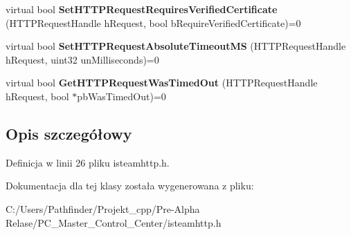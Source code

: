 \begin{DoxyCompactItemize}
\item 
\mbox{\label{class_i_steam_h_t_t_p_adfba72d99eeaabb5ee231c6bf915837d}} 
virtual bool {\bfseries Set\+H\+T\+T\+P\+Request\+Requires\+Verified\+Certificate} (H\+T\+T\+P\+Request\+Handle h\+Request, bool b\+Require\+Verified\+Certificate)=0
\item 
\mbox{\label{class_i_steam_h_t_t_p_a40ca210e9fd8a1d4a57a0856648a5ca3}} 
virtual bool {\bfseries Set\+H\+T\+T\+P\+Request\+Absolute\+Timeout\+MS} (H\+T\+T\+P\+Request\+Handle h\+Request, uint32 un\+Milliseconds)=0
\item 
\mbox{\label{class_i_steam_h_t_t_p_a92086a15c7a2929df9acf9398f1c0dd6}} 
virtual bool {\bfseries Get\+H\+T\+T\+P\+Request\+Was\+Timed\+Out} (H\+T\+T\+P\+Request\+Handle h\+Request, bool $\ast$pb\+Was\+Timed\+Out)=0
\end{DoxyCompactItemize}


\subsection{Opis szczegółowy}


Definicja w linii 26 pliku isteamhttp.\+h.



Dokumentacja dla tej klasy została wygenerowana z pliku\+:\begin{DoxyCompactItemize}
\item 
C\+:/\+Users/\+Pathfinder/\+Projekt\+\_\+cpp/\+Pre-\/\+Alpha Relase/\+P\+C\+\_\+\+Master\+\_\+\+Control\+\_\+\+Center/isteamhttp.\+h\end{DoxyCompactItemize}
